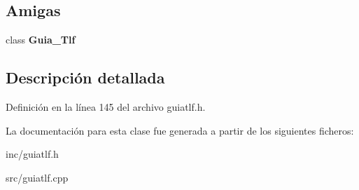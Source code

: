 \subsection*{Amigas}
\begin{DoxyCompactItemize}
\item 
\mbox{\label{classGuia__Tlf_1_1const__iterator_a4349d7a1b26a0aa94447235f95b2f940}} 
class {\bfseries Guia\+\_\+\+Tlf}
\end{DoxyCompactItemize}


\subsection{Descripción detallada}


Definición en la línea 145 del archivo guiatlf.\+h.



La documentación para esta clase fue generada a partir de los siguientes ficheros\+:\begin{DoxyCompactItemize}
\item 
inc/guiatlf.\+h\item 
src/guiatlf.\+cpp\end{DoxyCompactItemize}
